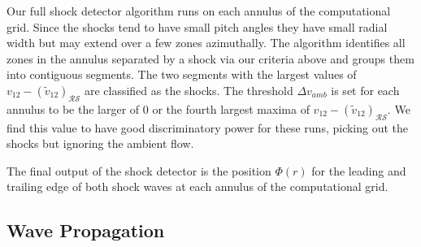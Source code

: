 \documentclass{emulateapj}
\begin{document}
Our full shock detector algorithm runs on each annulus of the computational grid.  Since the shocks tend to have small pitch angles they have small radial width but may extend over a few zones azimuthally.  The algorithm identifies all zones in the annulus separated by a shock via our criteria above and groups them into contiguous segments.  The two segments with the largest values of $v_{12} -  (\tilde{v}_{12})_{\mathcal{R}\mathcal{S}} $ are classified as the shocks. The threshold $\Delta v_{amb}$ is set for each annulus to be the larger of $0$ or the fourth largest maxima of $v_{12} -  (\tilde{v}_{12})_{\mathcal{R}\mathcal{S}} $. We find this value to have good discriminatory power for these runs, picking out the shocks but ignoring the ambient flow.

The final output of the shock detector is the position $\Phi(r)$ for the leading and trailing edge of both shock waves at each annulus of the computational grid.

\subsection{Wave Propagation}
\end{document}
